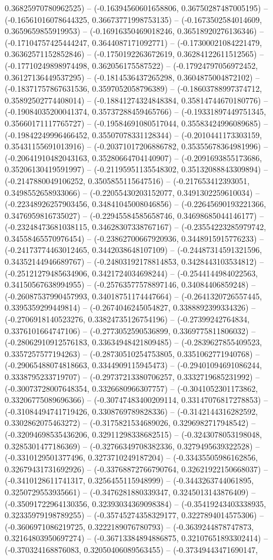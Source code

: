 0.36825970780962525) -- (-0.16394560601658806, 0.36750287487005195) -- (-0.16561016078644325, 0.36673771998753135) -- (-0.1673502584014609, 0.3659659855919953) -- (-0.16916350469018246, 0.36518920276136346) -- (-0.17104757425444247, 0.3644087171092771) -- (-0.17300021084221479, 0.36362571152852846) -- (-0.1750192263672619, 0.36284122611512565) -- (-0.17710249898974498, 0.362056175587522) -- (-0.17924797056972452, 0.36127136449537295) -- (-0.1814536437265298, 0.3604875004872102) -- (-0.18371757867631536, 0.3597052058796389) -- (-0.18603788997374712, 0.35892502774408014) -- (-0.18841274324848384, 0.35814744670180776) -- (-0.19084035200041374, 0.35737288459465766) -- (-0.19331897449751345, 0.35660171117765727) -- (-0.19584691080517044, 0.35583424996089685) -- (-0.19842249996466452, 0.35507078331128344) -- (-0.2010441173303159, 0.35431155691013916) -- (-0.20371017206886782, 0.35355678364981996) -- (-0.20641910482043163, 0.35280664704140907) -- (-0.2091693855173686, 0.35206130419591997) -- (-0.21195951135548302, 0.35132088843309894) -- (-0.2147880049106252, 0.3505855115647516) -- (-0.217653412393051, 0.3498552658933066) -- (-0.22055430203152077, 0.3491302259610034) -- (-0.22348926257903456, 0.34841045008046856) -- (-0.22645690193221366, 0.3476959816735027) -- (-0.22945584585658746, 0.34698685044146177) -- (-0.23248473681038115, 0.34628307338767167) -- (-0.23554223285979742, 0.34558465570976454) -- (-0.23862700667920936, 0.3448915915776233) -- (-0.24173774463012465, 0.3442038648107109) -- (-0.24487314591321596, 0.34352144946689767) -- (-0.24803192178814853, 0.3428443103534812) -- (-0.25121279485634906, 0.3421724034698244) -- (-0.2544144984022563, 0.34150567638994955) -- (-0.25763577578897146, 0.34084406859248) -- (-0.26087537990457993, 0.34018751174447664) -- (-0.2641320726557445, 0.3395359299449814) -- (-0.2674046245054827, 0.3388892399334326) -- (-0.2706918140523276, 0.33824735126754196) -- (-0.27399242764834, 0.3376101664747106) -- (-0.2773052590536899, 0.3369775811806032) -- (-0.28062910912576183, 0.33634948421809485) -- (-0.2839627855409523, 0.3357257577194263) -- (-0.28730510254753805, 0.3351062771940768) -- (-0.29065488074818663, 0.3344909115945473) -- (-0.29401094691086244, 0.3338795233719707) -- (-0.29737213380706257, 0.3332719685231992) -- (-0.30073728007648354, 0.3326680966307757) -- (-0.3041052301173862, 0.33206775089696366) -- (-0.30747483400209114, 0.33147076817278853) -- (-0.31084494741719426, 0.3308769789828336) -- (-0.3142144316282592, 0.3302862075463272) -- (-0.3175821534689026, 0.3296982717948542) -- (-0.32094698535436206, 0.32911298338682515) -- (-0.3243078053198048, 0.3285301477186369) -- (-0.32766349708382336, 0.3279495639322528) -- (-0.3310129501377496, 0.3273710249187204) -- (-0.33435505986162856, 0.32679431731692926) -- (-0.33768872766790764, 0.32621922150668037) -- (-0.3410128611741317, 0.3256455115948999) -- (-0.3443263744061895, 0.3250729553935661) -- (-0.3476281880339347, 0.3245013143876409) -- (-0.35091722964130356, 0.32393034369098384) -- (-0.35419243403338935, 0.32335979198789255) -- (-0.35745274358329177, 0.3227894014575306) -- (-0.3606971086219725, 0.3222189076780793) -- (-0.3639244878747873, 0.32164803950697274) -- (-0.36713384894886875, 0.32107651893302414) -- (-0.370324168876083, 0.32050406089563455) -- (-0.37349443471690147, 